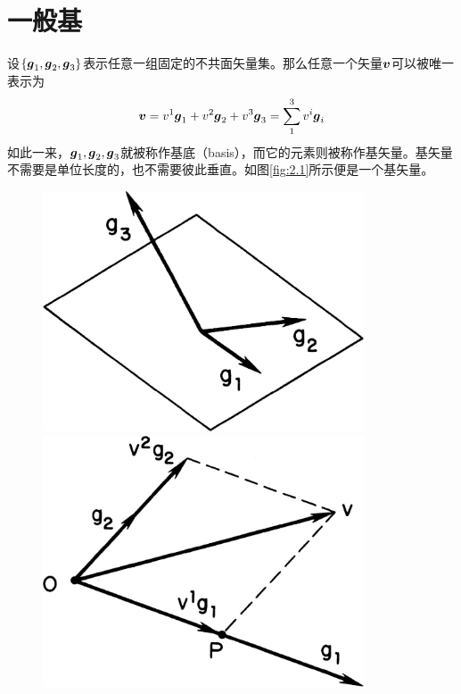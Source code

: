 \section{一般基}
设$\{\boldsymbol{g}_1,\boldsymbol{g}_2,\boldsymbol{g}_3\}$表示任意一组固定的不共面矢量集。那么任意一个矢量$\boldsymbol{v}$可以被唯一表示为
\begin{equation}\label{equ:2.1}
    \boldsymbol{v}=v^1\boldsymbol{g}_1+v^2\boldsymbol{g}_2+v^3\boldsymbol{g}_3=\sum_1^3{v^i\boldsymbol{g}_i}
\end{equation}
如此一来，${\boldsymbol{g}_1,\boldsymbol{g}_2,\boldsymbol{g}_3}$就被称作基底（basis），而它的元素则被称作基矢量。基矢量不需要是单位长度的，也不需要彼此垂直。如图\eqref{fig:2.1}所示便是一个基矢量。

\begin{figure}[htbp]
	\centering
	\begin{minipage}[b]{0.48\textwidth}
        \centering
        \includegraphics[width=0.85\textwidth]{./image/2.1.png}
        \caption{}
        \label{fig:2.1}
    \end{minipage}
    \begin{minipage}[b]{0.48\textwidth}
        \centering
        \includegraphics[width=0.85\textwidth]{./image/2.2.png}
        \caption{}
        \label{fig:2.2}
    \end{minipage}
\end{figure}

